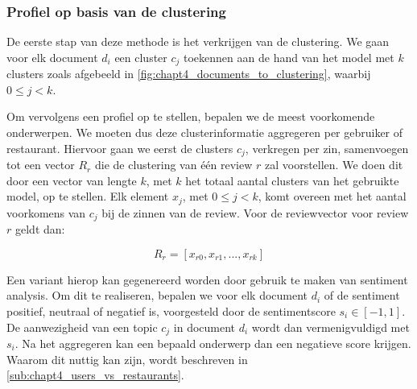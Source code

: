 \subsubsection{Profiel op basis van de clustering}
\label{sub:chapt4_profile_by_clustering}
De eerste stap van deze methode is het verkrijgen van de clustering. We gaan voor elk document $d_i$ een cluster $c_j$ toekennen aan de hand van het model met $k$ clusters zoals afgebeeld in \autoref{fig:chapt4_documents_to_clustering}, waarbij $0 \le j < k$.


Om vervolgens een profiel op te stellen, bepalen we de meest voorkomende onderwerpen. We moeten dus deze clusterinformatie aggregeren per gebruiker of restaurant. Hiervoor gaan we eerst de clusters $c_j$, verkregen per zin, samenvoegen tot een vector $R_r$ die de clustering van één review $r$ zal voorstellen. We doen dit door een vector van lengte $k$, met $k$ het totaal aantal clusters van het gebruikte model, op te stellen. Elk element $x_j$, met $0 \le j < k$, komt overeen met het aantal voorkomens van $c_j$ bij de zinnen van de review. Voor de reviewvector voor review $r$ geldt dan:

\begin{equation}
\label{eq:chapt4_profile_per_review}
    R_r = [x_{r0}, x_{r1}, ..., x_{rk}]
\end{equation}

Een variant hierop kan gegenereerd worden door gebruik te maken van sentiment analysis. Om dit te realiseren, bepalen we voor elk document $d_i$ of de sentiment positief, neutraal of negatief is, voorgesteld door de sentimentscore $s_i \in [-1, 1]$. De aanwezigheid van een topic $c_j$ in document $d_i$ wordt dan vermenigvuldigd met $s_i$. Na het aggregeren kan een bepaald onderwerp dan een negatieve score krijgen. Waarom dit nuttig kan zijn, wordt beschreven in \autoref{sub:chapt4_users_vs_restaurants}.

